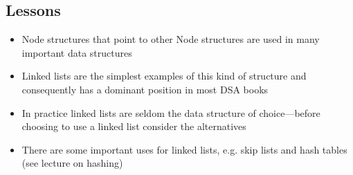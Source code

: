 
\begin{slide}
\section{Lessons}

\begin{PauseHighLight}
  \begin{itemize}
  \item Node structures that point to other Node structures are used
    in many important data structures\pause
  \item Linked lists are the simplest examples of this kind of structure
    and consequently has a dominant position in most DSA books\pause
  \item In practice linked lists are seldom the data structure of
    choice\pause---before choosing to use a linked list consider the
    alternatives\pause
  \item There are some important uses for linked lists, e.g. skip lists
    and hash tables (see lecture on hashing)\pause
  \end{itemize}
\end{PauseHighLight}
\end{slide}
